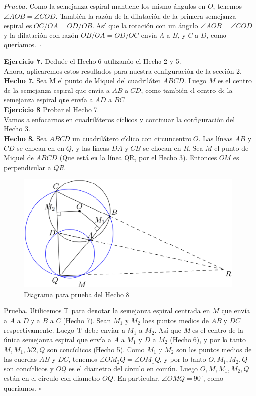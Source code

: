 \documentclass[11pt, a4paper]{article}
\begin{document}
$Prueba.$ Como la semejanza espiral mantiene los mismo \'angulos en $O$, tenemos $\angle AOB = \angle COD$. Tambi\'en la raz\'on de la dilataci\'on de la primera semejanza espiral es $OC/OA = OD/OB.$ As\'i que la rotaci\'on con un \'angulo $\angle AOB = \angle COD$ y la dilataci\'on con raz\'on $OB/OA = OD/OC$ env\'ia $A$ a $B$, y $C$ a $D$, como quer\'iamos. \hfill $\square$


\textbf{Ejercicio 7.} Dedude el Hecho 6 utilizando el Hecho 2 y 5. \\

Ahora, aplicaremos estos resultados para nuestra configuraci\'on de la secci\'on 2.
\\

\textbf{Hecho 7.} Sea M el punto de Miquel del cuadril\'ater $ABCD$. Luego $M$ es el centro de la semejanza espiral que env\'ia a $AB$ a $CD$, como tambi\'en el centro de la semejanza espiral que env\'ia a $AD$ a $BC$ \\

\textbf{Ejercicio 8} Probar el Hecho 7. \\

Vamos a enfocarnos en cuadril\'ateros c\'iclicos y continuar la configuraci\'on del Hecho 3. \\

\textbf{Hecho 8.} Sea $ABCD$ un cuadril\'atero c\'iclico con circuncentro $O$. Las l\'ineas $AB$ y $CD$ se chocan en en $Q$, y las l\'ineas $DA$ y $CB$ se chocan en $R$. Sea $M$ el punto de Miquel de $ABCD$ (Que est\'a en la l\'inea QR, por el Hecho 3). Entonces $OM$ es perpendicular a $QR$.
\newpage
\begin{figure}[h]
	\centering
	\includegraphics[scale=0.3]{p4.3}
	\caption{Diagrama para prueba del Hecho 8}
\end{figure}

Prueba. Utilicemos $\mathrm{T}$ para denotar la semejanza espiral centrada en $M$ que env\'ia a $A$ a $D$ y a $B$ a $C$ (Hecho 7). Sean $M_1$ y $M_2$ loes puntos medios de $AB$ y $DC$ respectivamente. Luego $\mathrm{T}$ debe env\'iar a $M_1$ a $M_2$. As\'i que $M$ es el centro de la \'unica semejanza espiral que env\'ia a $A$ a $M_1$ y $D$ a $M_2$ (Hecho 6), y por lo tanto $M, M_1, M2, Q$ son conc\'iclicos (Hecho 5).
Como $M_1$ y $M_2$ son los puntos medios de las cuerdas $AB$ y $DC$, tenemos $\angle OM_2Q = \angle OM_1Q$, y por lo tanto $O, M_1, M_2, Q$ son conc\'iclicos y $OQ$ es el diametro del c\'irculo en com\'un. Luego $O, M, M_1, M_2, Q $ est\'an en el c\'irculo con diametro $OQ$. En particular, $\angle OMQ = 90^{\circ}$, como quer\'iamos. \hfill $\square$
\end{document}
